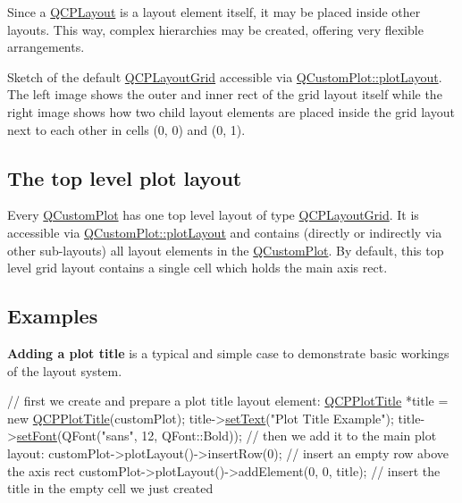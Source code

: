 Since a \hyperlink{class_q_c_p_layout}{Q\-C\-P\-Layout} is a layout element itself, it may be placed inside other layouts. This way, complex hierarchies may be created, offering very flexible arrangements.

     Sketch of the default \hyperlink{class_q_c_p_layout_grid}{Q\-C\-P\-Layout\-Grid} accessible via \hyperlink{class_q_custom_plot_afd280d4d621ae64a106543a545c508d7}{Q\-Custom\-Plot\-::plot\-Layout}. The left image shows the outer and inner rect of the grid layout itself while the right image shows how two child layout elements are placed inside the grid layout next to each other in cells (0, 0) and (0, 1).  \hypertarget{thelayoutsystem_layoutsystem-plotlayout}{}\subsection{The top level plot layout}\label{thelayoutsystem_layoutsystem-plotlayout}
Every \hyperlink{class_q_custom_plot}{Q\-Custom\-Plot} has one top level layout of type \hyperlink{class_q_c_p_layout_grid}{Q\-C\-P\-Layout\-Grid}. It is accessible via \hyperlink{class_q_custom_plot_afd280d4d621ae64a106543a545c508d7}{Q\-Custom\-Plot\-::plot\-Layout} and contains (directly or indirectly via other sub-\/layouts) all layout elements in the \hyperlink{class_q_custom_plot}{Q\-Custom\-Plot}. By default, this top level grid layout contains a single cell which holds the main axis rect.\hypertarget{thelayoutsystem_layoutsystem-examples}{}\subsection{Examples}\label{thelayoutsystem_layoutsystem-examples}
{\bfseries Adding a plot title} is a typical and simple case to demonstrate basic workings of the layout system. 
\begin{DoxyCode}
\textcolor{comment}{// first we create and prepare a plot title layout element:}
\hyperlink{class_q_c_p_plot_title}{QCPPlotTitle} *title = \textcolor{keyword}{new} \hyperlink{class_q_c_p_plot_title}{QCPPlotTitle}(customPlot);
title->\hyperlink{class_q_c_p_plot_title_aae5a93e88050dfb2cbf6adc087516821}{setText}(\textcolor{stringliteral}{"Plot Title Example"});
title->\hyperlink{class_q_c_p_plot_title_a199fc7170802ea65006c371875349e37}{setFont}(QFont(\textcolor{stringliteral}{"sans"}, 12, QFont::Bold));
\textcolor{comment}{// then we add it to the main plot layout:}
customPlot->plotLayout()->insertRow(0); \textcolor{comment}{// insert an empty row above the axis rect}
customPlot->plotLayout()->addElement(0, 0, title); \textcolor{comment}{// insert the title in the empty cell we just created}
\end{DoxyCode}
 

